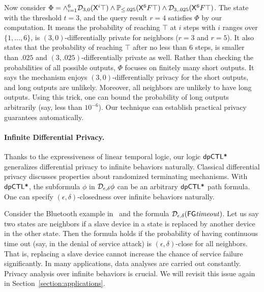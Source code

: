Now consider $\Phi=\wedge_{i=1}^{6} \mathcal{D}_{{3}, {0}}(\mathsf{X}^i \top) 
\wedge \mathbb{P}_{\le .025}(\mathsf{X}^6 F \top) \wedge \mathcal{D}_{{3}, {.025}}(\mathsf{X}^6 F
\top)$. The state with the threshold $t=3$, and the query result $r=4$ 
satisfies $\Phi$ by our computation. It means the
probability of reaching $\top$ at $i$ steps with $i$ ranges over
$\{1,\ldots,6\}$, is $(3, 0)$-differentially private for 
neighbors ($r=3$ and $r=5$). It also states that the
probability of reaching $\top$ after no less than $6$ steps, is
smaller than $.025$ and $(3, .025)$-differentially private as well. 
Rather than checking the probabilities of all possible outputs, $\Phi$
focuses on finitely many short outputs. It says the mechanism enjoys $(3,
0)$-differentially privacy for the short outputs, and long outputs are
unlikely. Moreover, all neighbors are unlikely to have long outputs. 
Using this trick, one can bound the probability of long outputs
arbitrarily (say, less than $10^{-6}$). Our technique can establish
practical privacy guarantees automatically. 


\paragraph{Infinite Differential Privacy.}
Thanks to the expressiveness of linear temporal logic, our logic $\textsf{dpCTL*}$ generalizes differential privacy to infinite
behaviors naturally. Classical differential privacy discusses properties about
randomized terminating mechanisms.
With $\textsf{dpCTL*}$, the subformula $\phi$ in $\mathcal{D}_{{\epsilon}, {\delta}} \phi$
can be an arbitrary $\textsf{dpCTL*}$ path formula. One can specify
$(\epsilon, \delta)$-closedness over infinite behaviors naturally.

Consider the Bluetooth example in~\cite{DKNP04} and the
formula $\mathcal{D}_{{\epsilon}, {\delta}}{(\mathsf{F} \mathsf{G} \mathit{timeout})}$. Let us say
two states are neighbors if a slave device in a state is replaced by
another device in the other state.
Then the formula holds if the probability of having
continuous time out (say, in the denial of service attack) is
$(\epsilon, \delta)$-close for all neighbors. That is, replacing a slave
device cannot increase the chance of service failure significantly.
In many applications, data analyses are carried out constantly. 
Privacy analysis over infinite behaviors is crucial. 
We will revisit this issue again in
Section~\ref{section:applications}. 